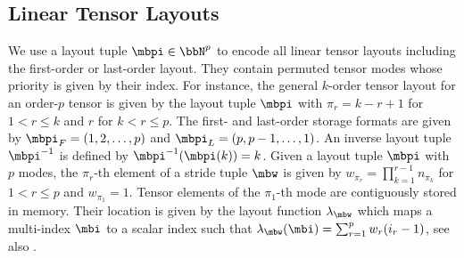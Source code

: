 \subsection{Linear Tensor Layouts}
\label{sec:preliminaries:layout}
We use a layout tuple $\mbpi \in \bbN^p$ to encode all linear tensor layouts including the first-order or last-order layout.
They contain permuted tensor modes whose priority is given by their index.
For instance, the general $k$-order tensor layout for an order-$p$ tensor is given by the layout tuple $\mbpi$ with $\pi_r = k-r+1$ for $1 < r \leq k$ and $r$ for $k < r \leq p$.
The first- and last-order storage formats are given by $\mbpi_F = (1,2,\dots,p)$ and $\mbpi_{L} = (p,p-1,\dots,1)$.
An inverse layout tuple $\mbpi^{-1}$ is defined by $\mbpi^{-1}(\mbpi(k)) = k$.
Given a layout tuple $\mbpi$ with $p$ modes, the $\pi_r$-th element of a stride tuple $\mbw$ is given by $w_{\pi_r} = \prod_{k=1}^{r-1} n_{\pi_k}$ for $1 < r \leq p$ and $w_{\pi_1} = 1$.
Tensor elements of the $\pi_1$-th mode are contiguously stored in memory.
Their location is given by the layout function $\lambda_{\mbw}$ which maps a multi-index $\mbi$ to a scalar index such that $\lambda_{\mbw}(\mbi) = \sum_{r=1}^p w_{r} (i_{r}-1)$, see also \cite{bassoy:2018:fast}.

